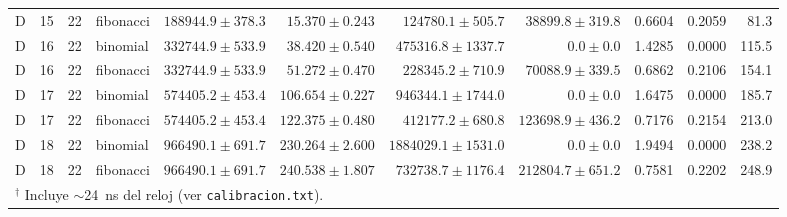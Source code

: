 {\begin{tabular}{ccclrrrrrrr}
D & 15 & 22 & fibonacci & $188944.9 \pm 378.3$ & $15.370 \pm 0.243$ & $124780.1 \pm 505.7$ & $38899.8 \pm 319.8$ & 0.6604 & 0.2059 & 81.3 \\
D & 16 & 22 & binomial & $332744.9 \pm 533.9$ & $38.420 \pm 0.540$ & $475316.8 \pm 1337.7$ & $0.0 \pm 0.0$ & 1.4285 & 0.0000 & 115.5 \\
D & 16 & 22 & fibonacci & $332744.9 \pm 533.9$ & $51.272 \pm 0.470$ & $228345.2 \pm 710.9$ & $70088.9 \pm 339.5$ & 0.6862 & 0.2106 & 154.1 \\
D & 17 & 22 & binomial & $574405.2 \pm 453.4$ & $106.654 \pm 0.227$ & $946344.1 \pm 1744.0$ & $0.0 \pm 0.0$ & 1.6475 & 0.0000 & 185.7 \\
D & 17 & 22 & fibonacci & $574405.2 \pm 453.4$ & $122.375 \pm 0.480$ & $412177.2 \pm 680.8$ & $123698.9 \pm 436.2$ & 0.7176 & 0.2154 & 213.0 \\
D & 18 & 22 & binomial & $966490.1 \pm 691.7$ & $230.264 \pm 2.600$ & $1884029.1 \pm 1531.0$ & $0.0 \pm 0.0$ & 1.9494 & 0.0000 & 238.2 \\
D & 18 & 22 & fibonacci & $966490.1 \pm 691.7$ & $240.538 \pm 1.807$ & $732738.7 \pm 1176.4$ & $212804.7 \pm 651.2$ & 0.7581 & 0.2202 & 248.9 \\
\hline
\multicolumn{11}{l}{\footnotesize $^{\dagger}$ Incluye $\sim$24~ns del reloj (ver \texttt{calibracion.txt}).} \\
\end{tabular}%
}
